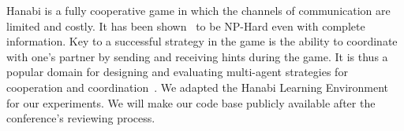 \documentclass[letterpaper]{article} %
\begin{document}
Hanabi is a fully cooperative game in which the channels of communication are limited and costly. It has been  shown~\cite{baffier2016hanabi} to be NP-Hard even with complete information. 
Key to a successful strategy in the game is the ability to coordinate with one's partner by sending and receiving hints during the game.   It is thus  a popular domain for designing and 
evaluating multi-agent strategies for cooperation and coordination~\cite{bard2020hanabi}.
We adapted the Hanabi Learning Environment for our experiments. We will make our code base publicly available after the conference's reviewing process. 

 


\end{document}
